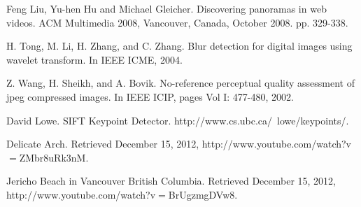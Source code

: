 
\begin{thebibliography}{99}

  
 Feng Liu, Yu-hen Hu and Michael Gleicher. Discovering panoramas in web videos. 
ACM Multimedia 2008, Vancouver, Canada, October 2008. pp. 329-338.  

 H. Tong, M. Li, H. Zhang, and C. Zhang. Blur
detection for digital images using wavelet transform.
In IEEE ICME, 2004.

 Z. Wang, H. Sheikh, and A. Bovik. No-reference
perceptual quality assessment of jpeg compressed
images. In IEEE ICIP, pages Vol I: 477-480, 2002.

 David Lowe. SIFT Keypoint Detector.
http://www.cs.ubc.ca/~lowe/keypoints/.

 Delicate Arch.  Retrieved December 15, 2012,
http://www.youtube.com/watch?v$=$ZMbr8uRk3nM.

 Jericho Beach in Vancouver British Columbia.  Retrieved December 15, 2012,
http://www.youtube.com/watch?v$=$BrUgzmgDVw8.

\end{thebibliography}

